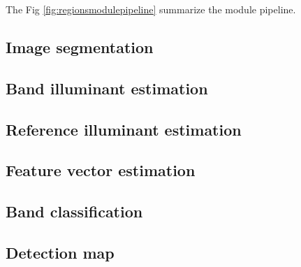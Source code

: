 The Fig \ref{fig:regionsmodulepipeline} summarize the module pipeline.

\subsection{Image segmentation}



\subsection{Band illuminant estimation}

\subsection{Reference illuminant estimation}

\subsection{Feature vector estimation}

\subsection{Band classification}

\subsection{Detection map}

